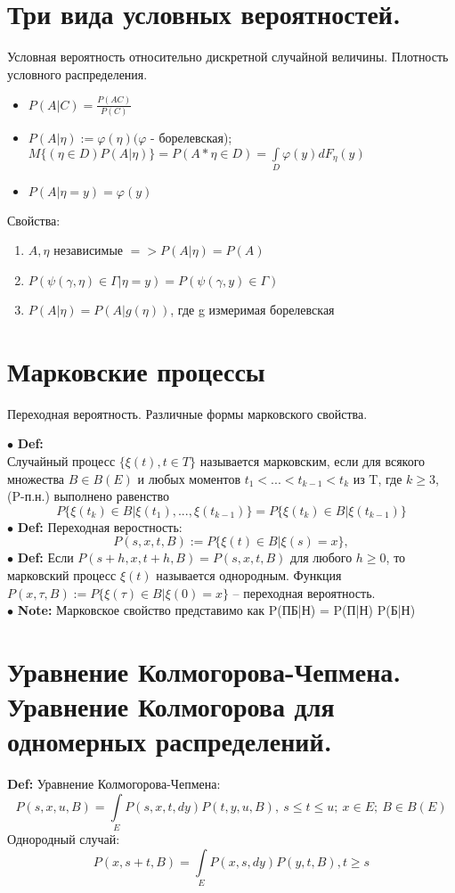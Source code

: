 \documentclass[11pt]{article}
\begin{document}
\section{Три вида условных вероятностей.}
\begin{center}Условная вероятность относительно дискретной случайной величины. Плотность условного распределения.\end{center}
\begin{itemize}
	\item $P(A|C) = \frac{P(AC)}{P(C)}$
	\item $P(A|\eta) := \varphi(\eta) (\varphi$ - борелевская); $M\{(\eta \in D)P(A|\eta)\}=P(A*\eta \in D) = \int\limits_{D} \varphi(y)dF_\eta(y)$
	\item $P(A|\eta=y) = \varphi(y)$ \\
\end{itemize}
Свойства:
\begin{enumerate}
	\item $A, \eta $ независимые $=> P(A|\eta) = P(A)$
	\item $P(\psi(\gamma, \eta) \in \Gamma | \eta=y) = P(\psi(\gamma, y) \in \Gamma)$
	\item $P(A|\eta) = P(A|g(\eta))$, где g измеримая борелевская
\end{enumerate}

\section{Марковские процессы}
\begin{center}Переходная вероятность. Различные формы марковского свойства. \end{center}
$\bullet$ \textbf{Def:} \\Случайный процесс $\{\xi(t), t \in T\}$ называется марковским, если для всякого множества $B \in B(E)$ и любых моментов $t_1 < ... < t_{k−1} < t_k$ из T, где $k \geq 3 $, (P-п.н.) выполнено равенство
$$ P\{\xi(t_k) \in B | \xi(t_1), . . . , \xi(t_{k−1})\} = P\{\xi(t_k) \in B | \xi(t_{k−1})\} $$
$\bullet$ \textbf{Def:} Переходная веростность:
$$P(s,x,t,B) := P\{\xi(t) \in B | \xi(s) = x\},$$
$\bullet$ \textbf{Def:} Если $P(s+h,x,t+h,B)=P(s,x,t,B)$ для любого $h\geq 0$, то марковский процесс $\xi(t)$ называется однородным. Функция $P(x,\tau,B) := P\{\xi(\tau) \in B | \xi(0) = x\}$ – переходная вероятность. \\
$\bullet$ \textbf{Note:} Марковское свойство представимо как P(ПБ|Н) = P(П|Н) P(Б|Н)

\section{Уравнение Колмогорова-Чепмена. Уравнение Колмогорова для одномерных распределений.}
\textbf{Def:} Уравнение Колмогорова-Чепмена:
$$P(s,x,u,B) = \int\limits_{E} P(s,x,t,dy)P(t,y,u,B), \ s \leq t \leq u; \ x \in E; \ B \in B(E) $$
Однородный случай:
$$P(x,s+t,B)= \int\limits_{E} P(x,s,dy)P(y,t,B), t\geq s $$
\end{document}
